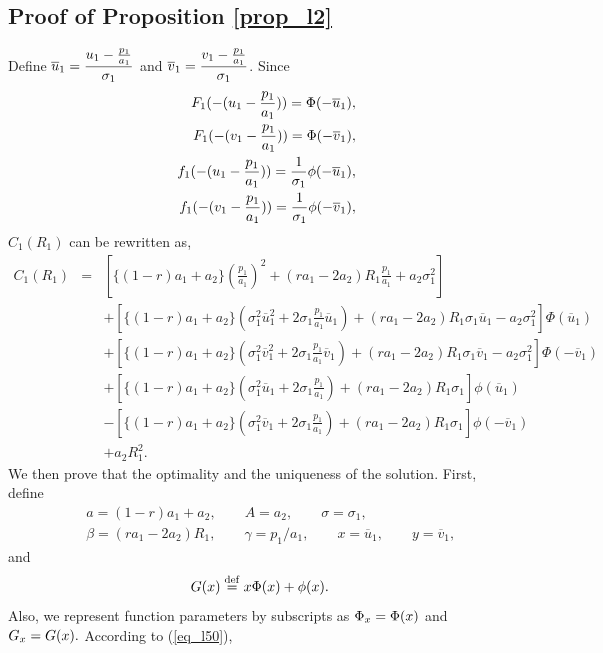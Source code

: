 \subsection{Proof of Proposition \ref{prop_l2}}
Define $\displaystyle \overline{u}_1=\frac{\u1}{\sigma_1}$ and
$\displaystyle \overline{v}_1=\frac{\v1}{\sigma_1}$.
  Since
\begin{eqnarray}
 & & F_1(-(\u1))=\Phi(-\overline{u}_1), \label{eq_l46}\\
 & & F_1(-(\v1))=\Phi(-\overline{v}_1), \label{eq_l47}\\
 & & \displaystyle f_1(-(\u1))=\frac{1}{\sigma_1}\phi(-\overline{u}_1), \label{eq_l48}\\
 & & \displaystyle f_1(-(\v1))=\frac{1}{\sigma_1}\phi(-\overline{v}_1), \label{eq_l49}
\end{eqnarray}
$C_1(R_1)$ can be rewritten as,
\begin{eqnarray} \label{eq_l50}
  C_1(R_1) & = &  [\{(1-r)a_1+a_2\}(\frac{p_1}{a_1})^2+(ra_1-2a_2)R_1\frac{p_1}{a_1}+a_2\sigma_1^2] \nonumber \\
      &   &  +[\{(1-r)a_1+a_2\}(\sigma_1^2\overline{u}_1^2+2\sigma_1\frac{p_1}{a_1}\overline{u}_1)+(ra_1-2a_2)R_1\sigma_1\overline{u}_1-a_2\sigma_1^2]\Phi(\overline{u}_1) \nonumber \\
      &   &  +[\{(1-r)a_1+a_2\}(\sigma_1^2\overline{v}_1^2+2\sigma_1\frac{p_1}{a_1}\overline{v}_1)+(ra_1-2a_2)R_1\sigma_1\overline{v}_1-a_2\sigma_1^2]\Phi(-\overline{v}_1) \nonumber \\
      &   &  +[\{(1-r)a_1+a_2\}(\sigma_1^2\overline{u}_1+2\sigma_1\frac{p_1}{a_1})+(ra_1-2a_2)R_1\sigma_1]\phi(\overline{u}_1) \nonumber \\
      &   &  -[\{(1-r)a_1+a_2\}(\sigma_1^2\overline{v}_1+2\sigma_1\frac{p_1}{a_1})+(ra_1-2a_2)R_1\sigma_1]\phi(-\overline{v}_1) \nonumber \\
      &   &  +a_2R_1^2.
\end{eqnarray}
We then prove that the optimality and the uniqueness of the solution.  First, define 
\begin{eqnarray*}
  & & a = (1-r)a_1 + a_2, \qquad A = a_2, \qquad \sigma = \sigma_1, \\
  & & \beta = (ra_1 - 2a_2)R_1, \qquad \gamma = p_1/a_1, \qquad x = \overline{u}_1, \qquad y = \overline{v}_1,
\end{eqnarray*}
and
\[
  G(x) \stackrel{\mathrm{def}}{=} x \Phi(x) + \phi(x).
\]
Also, we represent function parameters by subscripts as $\Phi_x = \Phi(x)$ and $G_x = G(x).$  According to (\ref{eq_l50}),
